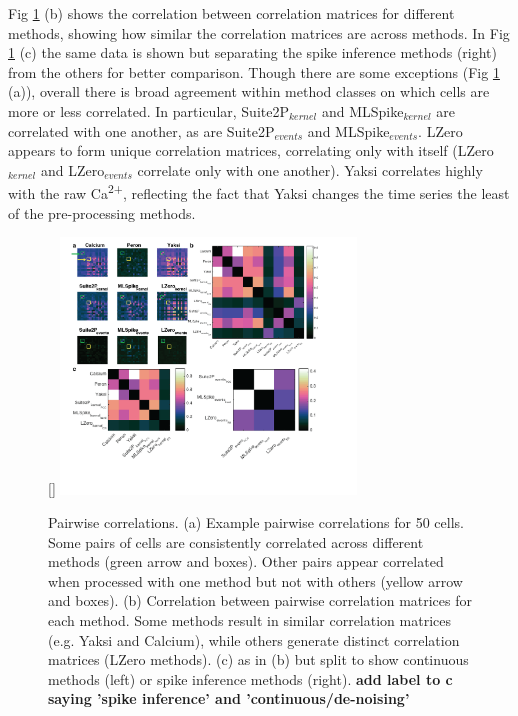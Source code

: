 \documentclass[a4paper,10pt,twocolumn]{article}
\begin{document}
Fig \ref{fig:cxy_comparison} (b) shows the correlation between correlation matrices for different methods, showing how similar the correlation matrices are across methods. In Fig \ref{fig:cxy_comparison} (c) the same data is shown but separating the spike inference methods (right) from the others for better comparison. Though there are some exceptions (Fig \ref{fig:cxy_comparison} (a)), overall there is broad agreement within method classes on which cells are more or less correlated. In particular, Suite2P$_{kernel}$ and MLSpike$_{kernel}$ are correlated with one another, as are Suite2P$_{events}$ and MLSpike$_{events}$. LZero appears to form unique correlation matrices, correlating only with itself (LZero$_{kernel}$ and LZero$_{events}$ correlate only with one another). Yaksi correlates highly with the raw Ca\textsuperscript{2+}, reflecting the fact that Yaksi changes the time series the least of the pre-processing methods. 




\begin{figure}
[\FBwidth]
{\includegraphics[trim={10 35 35 5}, clip, width=0.7\textwidth]{full_figs/why_deconvolve_F8.png}}
{\caption{\label{fig:cxy_comparison}Pairwise correlations. (a) Example pairwise correlations for 50 cells. Some pairs of cells are consistently correlated across different methods (green arrow and boxes). Other pairs appear correlated when processed with one method but not with others (yellow arrow and boxes). (b) Correlation between pairwise correlation matrices for each method. Some methods result in similar correlation matrices (e.g. Yaksi and Calcium), while others generate distinct correlation matrices (LZero methods). (c) as in (b) but split to show continuous methods (left) or spike inference methods (right). \textbf{add label to c saying 'spike inference' and 'continuous/de-noising'}}}
\end{figure}
\end{document}
